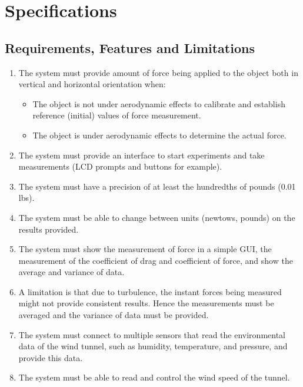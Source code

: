 \section{Specifications}
	\subsection{Requirements, Features and Limitations}
		\begin{enumerate}
			\item The system must provide amount of force being applied to the object both in vertical and horizontal orientation when: 
			
			\begin{itemize}
				\item The object is not under aerodynamic effects to calibrate and establish reference (initial) values of force measurement.
				\item The object is under aerodynamic effects to determine the actual force.
			\end{itemize}
			
			\item The system must provide an interface to start experiments and take measurements (LCD prompts and buttons for example).

			\item The system must have a precision of at least the hundredths of pounds (0.01 lbs).

			\item The system must be able to change between units (newtows, pounds) on the results provided.

			\item The system must show the measurement of force in a simple GUI, the measurement of the coefficient of drag and coefficient of force, and show the average and variance of data.

			\item A limitation is that due to turbulence, the instant forces being measured might not provide consistent results. Hence the measurements must be averaged and the variance of data must be provided.

			\item The system must connect to multiple sensors that read the environmental data of the wind tunnel, such as humidity, temperature, and pressure, and provide this data.

			\item The system must be able to read and control the wind speed of the tunnel.

		\end{enumerate}


